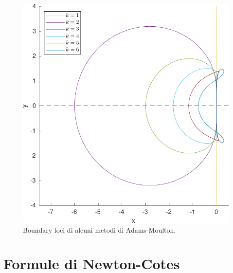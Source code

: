 \begin{figure}[p]
\centering
\includegraphics[height=0.4\textheight]{adams-moulton-boundary-loci.pdf}
\caption{Boundary loci di alcuni metodi di Adams-Moulton.}
\label{fig:lmf-adams-moulton-boundary-loci}
\end{figure}

\section{Formule di Newton-Cotes}

